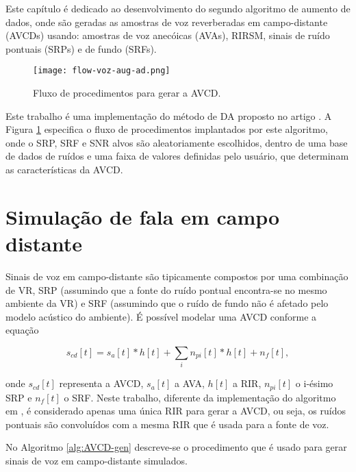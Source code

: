 Este capítulo é dedicado ao desenvolvimento do segundo algoritmo de aumento de dados, onde são geradas as amostras de voz 
reverberadas em campo-distante (AVCDs) usando: amostras de voz anecóicas (AVAs), RIRSM, sinais de ruído pontuais (SRPs) e de fundo (SRFs).

\begin{figure} [H]
    \centering
    \texttt{[image: flow-voz-aug-ad.png]}
    \caption{Fluxo de procedimentos para gerar a AVCD.} 
    \label{fig:flow-voz-rev}
\end{figure}

Este trabalho é uma implementação do método de DA proposto no artigo \cite{Speech_Rec}. A Figura \ref{fig:flow-voz-rev} especifica 
o fluxo de procedimentos implantados por este algoritmo, onde o SRP, SRF e SNR alvos são aleatoriamente escolhidos, 
dentro de uma base de dados de ruídos e uma faixa de valores definidas pelo usuário, que determinam as características da AVCD. 

\section{Simulação de fala em campo distante} 

Sinais de voz em campo-distante são tipicamente compostos por uma combinação de VR, SRP (assumindo que a fonte do ruído pontual encontra-se 
no mesmo ambiente da VR) e SRF (assumindo que o ruído de fundo não é afetado pelo modelo acústico do ambiente).
É possível modelar uma AVCD conforme a equação

\begin{equation} \label{eqn:AVCD-model}
    s_{cd}[t] = s_a[t] \ast h[t] + \sum_i n_{pi}[t] \ast h[t] + n_f[t]
    ,
\end{equation}

\noindent
onde $s_{cd}[t]$ representa a AVCD, $s_a[t]$ a AVA, $h[t]$ a RIR, $n_{pi}[t]$ o i-ésimo SRP e $n_f[t]$ o SRF.
Neste trabalho, diferente da implementação do algoritmo em \cite{Speech_Rec}, é considerado apenas uma única RIR
para gerar a AVCD, ou seja, os ruídos pontuais são convoluídos com a mesma RIR que é usada para a fonte de voz.

No Algoritmo \ref{alg:AVCD-gen} descreve-se o procedimento que é usado para gerar sinais de voz em campo-distante simulados. 
\bigbreak
\bigbreak


